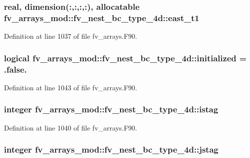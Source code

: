 \subsubsection[{east\-\_\-t1}]{\setlength{\rightskip}{0pt plus 5cm}real, dimension(\-:,\-:,\-:,\-:), allocatable fv\-\_\-arrays\-\_\-mod\-::fv\-\_\-nest\-\_\-bc\-\_\-type\-\_\-4d\-::east\-\_\-t1}\label{structfv__arrays__mod_1_1fv__nest__bc__type__4d_a9fa39750a15f788f1a5fdbf6928e410b}


Definition at line 1037 of file fv\-\_\-arrays.\-F90.

\subsubsection[{initialized}]{\setlength{\rightskip}{0pt plus 5cm}logical fv\-\_\-arrays\-\_\-mod\-::fv\-\_\-nest\-\_\-bc\-\_\-type\-\_\-4d\-::initialized = .false.}\label{structfv__arrays__mod_1_1fv__nest__bc__type__4d_aecff9a6f77e18f40c82fe06def548222}


Definition at line 1043 of file fv\-\_\-arrays.\-F90.

\subsubsection[{istag}]{\setlength{\rightskip}{0pt plus 5cm}integer fv\-\_\-arrays\-\_\-mod\-::fv\-\_\-nest\-\_\-bc\-\_\-type\-\_\-4d\-::istag}\label{structfv__arrays__mod_1_1fv__nest__bc__type__4d_a722647a593199bed1b1c149522653a1f}


Definition at line 1040 of file fv\-\_\-arrays.\-F90.

\subsubsection[{jstag}]{\setlength{\rightskip}{0pt plus 5cm}integer fv\-\_\-arrays\-\_\-mod\-::fv\-\_\-nest\-\_\-bc\-\_\-type\-\_\-4d\-::jstag}\label{structfv__arrays__mod_1_1fv__nest__bc__type__4d_a5589c9903be6ae678db7acd0d1027106}


